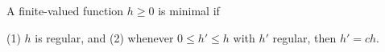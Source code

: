 A finite-valued function $h \geq 0$ is minimal if

(1) $h$ is regular, and
(2) whenever $0 \leq h' \leq h$ with $h'$ regular, then $h' = ch$.
